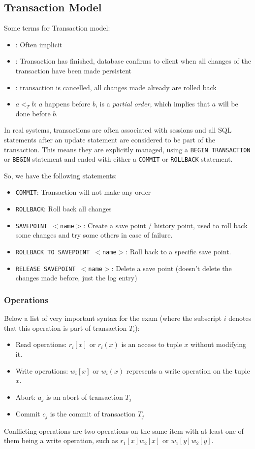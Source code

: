 \newpage
\subsection{Transaction Model}
\inlinedefinition Some terms for Transaction model:
\begin{itemize}
    \item {}: Often implicit
    \item {}: Transaction has finished, database confirms to client when all changes of the transaction have been made persistent
    \item {}: transaction is cancelled, all changes made already are rolled back
    \item $a <_T b$: $a$ happens before $b$, is a \textit{partial order}, which implies that $a$ will be done before $b$.
\end{itemize}

In real systems, transactions are often associated with sessions and all SQL statements after an update statement are considered to be part of the transaction.
This means they are explicitly managed, using a \texttt{BEGIN TRANSACTION} or \texttt{BEGIN} statement and ended with either a \texttt{COMMIT} or \texttt{ROLLBACK} statement.

So, we have the following statements:
\begin{itemize}
    \item \texttt{COMMIT}: Transaction will not make any order
    \item \texttt{ROLLBACK}: Roll back all changes
    \item \texttt{SAVEPOINT $<$name$>$}: Create a save point / history point, used to roll back some changes and try some others in case of failure.
    \item \texttt{ROLLBACK TO SAVEPOINT $<$name$>$}: Roll back to a specific save point.
    \item \texttt{RELEASE SAVEPOINT $<$name$>$}: Delete a save point (doesn't delete the changes made before, just the log entry)
\end{itemize}

\subsubsection{Operations}
Below a list of very important syntax for the exam (where the subscript $i$ denotes that this operation is part of transaction $T_i$):
\begin{itemize}
    \item Read operations: $r_i[x]$ or $r_i(x)$ is an access to tuple $x$ without modifying it.
    \item Write operations: $w_i[x]$ or $w_i(x)$ represents a write operation on the tuple $x$.
    \item Abort: $a_j$ is an abort of transaction $T_j$
    \item Commit $c_j$ is the commit of transaction $T_j$
\end{itemize}
Conflicting operations are two operations on the same item with at least one of them being a write operation, such as $r_1[x] w_2[x]$ or $w_1[y] w_2[y]$.

